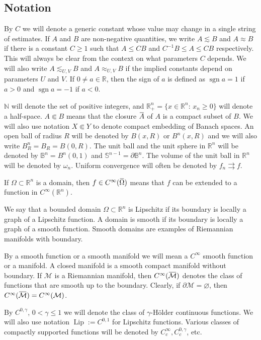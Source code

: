 \documentclass[intlimits,12pt,reqno]{amsart}
\newcommand{\cM}{\mathcal M}
\newcommand{\Sph}{\mathbb S}
\def\sgn{\operatorname{sgn}}
\newcommand{\bbbr}{\mathbb R}
\newcommand{\bbbb}{\mathbb B}
\newcommand{\bbbn}{\mathbb N}
\newcommand{\R}{\mathbb R}
\newcommand{\overbar}[1]{\mkern 1.7mu\overline{\mkern-1.7mu#1\mkern-1.5mu}\mkern 1.5mu}
\numberwithin{equation}{section}
\def\lip{\operatorname{Lip}}
\theoremstyle{definition}
\begin{document}
\subsection{Notation}
\label{S2}
By $C$ we will denote a generic constant whose value may change in a single string of estimates.
If $A$ and $B$ are non-negative quantities, we write $A\lesssim B$ and $A\approx B$ if there is a constant $C\geq 1$ such that $A\leq CB$ and $C^{-1}B\leq A\leq CB$ respectively. This will always be clear from the context on what parameters $C$ depends. We will also write $A\lesssim_{U,V} B$ and $A\approx_{U,V} B$ if the implied constants depend on parameters $U$ and $V$.
If $0\neq a\in\R$, then the sign of $a$ is defined as $\sgn a=1$ if $a>0$ and $\sgn a=-1$ if $a<0$.


$\bbbn$ will denote the set of positive integers, and
$\R^n_+=\{x\in\R^n:\, x_n\geq 0\}$ will denote a half-space.
$A\Subset B$ means that the closure $\overbar{A}$ of $A$ is a compact subset of $B$.
We will also use notation $X\Subset Y$ to denote compact embedding of Banach spaces.
An open ball of radius $R$ will be denoted by $B(x,R)$ or $B^n(x,R)$ and we will also write  $B_R^n=B_R=B(0,R)$. The unit ball and the unit sphere in $\bbbr^n$ will be denoted by $\bbbb^n=B^n(0,1)$ and $\Sph^{n-1}=\partial\bbbb^n$.
The volume of the unit ball in $\mathbb{R}^n$ will be denoted by $\omega_n$.
Uniform convergence will often be denoted by $f_n\rightrightarrows f$.




If $\Omega\subset\R^n$ is a domain, then $f\in C^\infty(\overbar{\Omega})$ means that $f$ can be extended to a function in $C^\infty(\R^n)$.

We say that a bounded domain $\Omega\subset\R^n$ is Lipschitz if its boundary is locally a graph of a Lipschitz function.  A domain is smooth if its boundary is locally a graph of a smooth function. Smooth domains are examples of Riemannian manifolds with boundary.

By a smooth function or a smooth manifold we will mean a $C^\infty$ smooth function or  a manifold.
A closed manifold is a smooth compact manifold without boundary. If $\cM$ is a Riemannian manifold, then $C^{\infty}(\overbar{\cM})$ denotes the class of functions that are smooth up to the boundary. Clearly, if $\partial\cM=\varnothing$, then $C^\infty(\overbar{\cM})=C^\infty(\cM)$.


By $C^{0,\gamma}$, $0<\gamma\leq 1$ we will denote the class of $\gamma$-H\"older continuous functions.
We will also use notation $\lip:=C^{0,1}$ for Lipschitz functions.
Various classes of compactly supported functions will be denoted by $C_c^\infty, C_c^{0,\gamma}$, etc.
\end{document}
